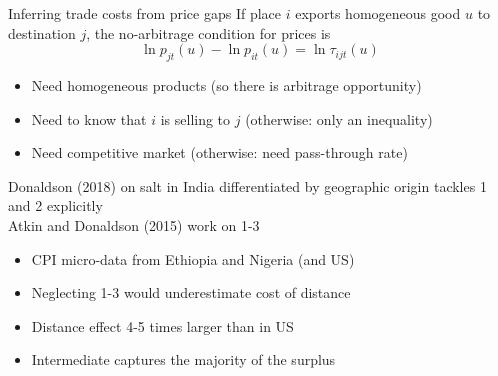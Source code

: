 \documentclass[10pt,notes=hide]{beamer}
\begin{document}
\begin{frame}{Inferring trade costs from price gaps}
If place $i$ exports homogeneous good $u$ to destination $j$, 
the no-arbitrage condition for prices is
$$\ln p_{jt}(u) -\ln p_{it}(u) = \ln \tau_{ijt}(u)$$
\vspace{-6mm}
\begin{itemize}
	\item Need homogeneous products (so there is arbitrage opportunity)
	\item Need to know that $i$ is selling to $j$ (otherwise: only an inequality)
	\item Need competitive market (otherwise: need pass-through rate)
\end{itemize}
Donaldson (2018) on salt in India differentiated by geographic origin tackles 1 and 2 explicitly\\
Atkin and Donaldson (2015) work on 1-3
\begin{itemize}
	\item CPI micro-data from Ethiopia and Nigeria (and US)
	\item Neglecting 1-3 would underestimate cost of distance
	\item Distance effect 4-5 times larger than in US
	\item Intermediate captures the majority of the surplus
\end{itemize}
\end{frame}
\end{document}
